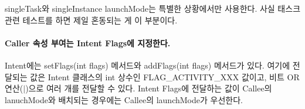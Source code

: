 singleTask와 singleInstance launchMode는 특별한 상황에서만 사용한다. 사실 태스크 관련 테스트를 하면 제일 혼동되는 게 이 부분이다.

\paragraph{Caller 속성 부여는 Intent Flags에 지정한다.}
Intent에는 setFlags(int flags) 메서드와 addFlags(int flags) 메서드가 있다. 여기에 전달되는 값은 Intent 클래스의 int 상수인 FLAG\_ACTIVITY\_XXX 값이고, 비트 OR 연산($|$)으로 여러 개를 전달할 수 있다. 
Intent Flags에 전달하는 값이 Callee의 lanuchMode와 배치되는 경우에는 Callee의 launchMode가 우선한다.\\

